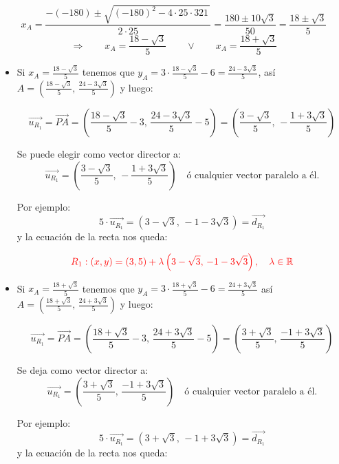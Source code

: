 \documentclass[11pt]{article}
\begin{document}
\begin{enumerate}[\hspace{-5mm} 1) ]
\begin{enumerate}[(a)]
\[
x_A = \frac{-(-180) \pm \sqrt{(-180)^2 - 4 \cdot 25 \cdot321 \, } }{2 \cdot 25 }
= \frac{180\pm 10\sqrt{3}}{50} = \frac{18\pm  \sqrt{3}}{5}\]
\[   
\Longrightarrow    
\qquad   
x_A = \frac{18 -  \sqrt{3}}{5} \qquad  \lor \qquad x_A = \frac{18 +  \sqrt{3}}{5}
\] 




\begin{itemize}
    \item Si $x_A=\frac{18 -  \sqrt{3}}{5}    $ tenemos que $y_A=  3\cdot\frac{18 -  \sqrt{3}}{5}  -6 = \frac{24 - 3 \sqrt{3}}{5}   $, así     $A=\left( \frac{18 -  \sqrt{3}}{5}   ,\, \frac{24 - 3 \sqrt{3}}{5}\right)$  y luego:




\[
\overrightarrow{u_{R_1}} =  \overrightarrow{PA} 
=
\left( \frac{18 -  \sqrt{3}}{5} -3  ,\, \frac{24 - 3 \sqrt{3}}{5} -5 \right)
= 
\left( \frac{3 -  \sqrt{3}}{5}   ,\,- \frac{1 + 3 \sqrt{3}}{5}  \right)
\]

Se puede elegir como vector director a:
\[
\overrightarrow{u_{R_1}} =  \left( \frac{3 -  \sqrt{3}}{5}   ,\,- \frac{1 + 3 \sqrt{3}}{5}  \right) \quad \text{ó cualquier vector paralelo a él.}
\]

Por ejemplo:
\[
5 \cdot \overrightarrow{u_{R_1}} = \left( 3 -  \sqrt{3}   ,\,-  1 -3 \sqrt{3}   \right)=\overrightarrow{d_{R_1}}
\]
y la ecuación de la recta nos queda: 

\[
\textcolor{red}{R_1: (x,y) = (3,5) + \lambda\left( 3 -  \sqrt{3}   ,\,-  1 -3 \sqrt{3}   \right), \quad \lambda \in \mathbb{R}}
\]


    

    \item Si $x_A=  \frac{18 + \sqrt{3}}{5}  $ tenemos que $y_A= 3\cdot  \frac{18 + \sqrt{3}}{5}  -6 = \frac{24 + 3 \sqrt{3}}{5}  $ así     $A=\left( \frac{18 +  \sqrt{3}}{5}   ,\, \frac{24 + 3 \sqrt{3}}{5}\right)$  y luego:




\[
\overrightarrow{u_{R_1}} =  \overrightarrow{PA} 
=
\left( \frac{18 + \sqrt{3}}{5} -3  ,\, \frac{24 + 3 \sqrt{3}}{5} -5 \right)
= 
\left( \frac{3 +  \sqrt{3}}{5}   ,\, \frac{-1 + 3 \sqrt{3}}{5}  \right)
\]

Se deja como vector director a:
\[
\overrightarrow{u_{R_1}} =  \left( \frac{3 +  \sqrt{3}}{5}   ,\, \frac{ -1 + 3 \sqrt{3}}{5}  \right) \quad \text{ó cualquier vector paralelo a él.}
\]

Por ejemplo:
\[
5 \cdot \overrightarrow{u_{R_1}} = \left( 3 +  \sqrt{3}   ,\,-  1 +3 \sqrt{3}   \right)=\overrightarrow{d_{R_1}}
\]
y la ecuación de la recta nos queda: 


\end{itemize}
\end{enumerate}
\end{enumerate}
\end{document}
